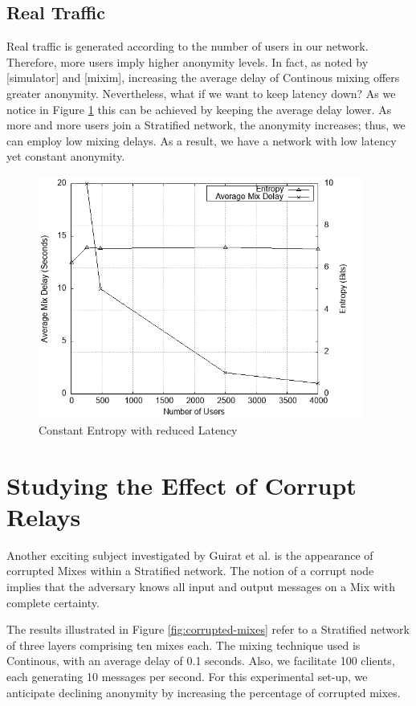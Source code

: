 \documentclass[logo,msc,cyber]{infthesis}   %
\begin{document}
\subsection{Real Traffic}

Real traffic is generated according to the number of users in our network.
Therefore, more users imply higher anonymity levels. In fact, as noted by
[simulator] and [mixim], increasing the average delay of Continous mixing offers
greater anonymity. Nevertheless, what if we want to keep latency down? As we
notice in Figure \ref{fig:nym-stratified-low-latency-constant-anonymity} this
can be achieved by keeping the average delay lower. As more and more users join a
Stratified network, the anonymity increases; thus, we can employ low mixing
delays. As a result, we have a network with low latency yet constant anonymity.

\begin{figure}[h!]
    \centering
    \includegraphics[height=8cm]{figures/simulator/5.png}
    \caption{Constant Entropy with reduced Latency}
    \label{fig:nym-stratified-low-latency-constant-anonymity}
 \end{figure}

\section{Studying the Effect of Corrupt Relays}

Another exciting subject investigated by Guirat et al.\cite{ben2021mixim} is the
appearance of corrupted Mixes within a Stratified network. The notion of a
corrupt node implies that the adversary knows all input and output messages on a
Mix with complete certainty. 

The results illustrated in Figure \ref{fig:corrupted-mixes} refer to a
Stratified network of three layers comprising ten mixes each. The mixing technique
used is Continous, with an average delay of 0.1 seconds. Also, we facilitate 100
clients, each generating 10 messages per second. For this experimental set-up,
we anticipate declining anonymity by increasing the percentage of corrupted
mixes. 
\end{document}
